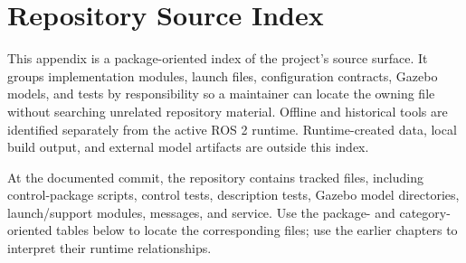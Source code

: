 \chapter{Repository Source Index}
\label{app:catalog}

This appendix is a package-oriented index of the project's source surface. It
groups implementation modules, launch files, configuration contracts, Gazebo
models, and tests by responsibility so a maintainer can locate the owning file
without searching unrelated repository material. Offline and historical tools
are identified separately from the active ROS 2 runtime. Runtime-created data,
local build output, and external model artifacts are outside this index.

At the documented commit, the repository contains
\RepositoryTrackedFileCount{} tracked files, including
\RepositoryScriptCount{} control-package scripts,
\RepositoryControlTestCount{} control tests,
\RepositoryDescriptionTestCount{} description tests,
\RepositoryModelCount{} Gazebo model directories,
\RepositoryLaunchCount{} launch/support modules,
\RepositoryMessageCount{} messages, and \RepositoryServiceCount{} service.
Use the package- and category-oriented tables below to locate the corresponding
files; use the earlier chapters to interpret their runtime relationships.


